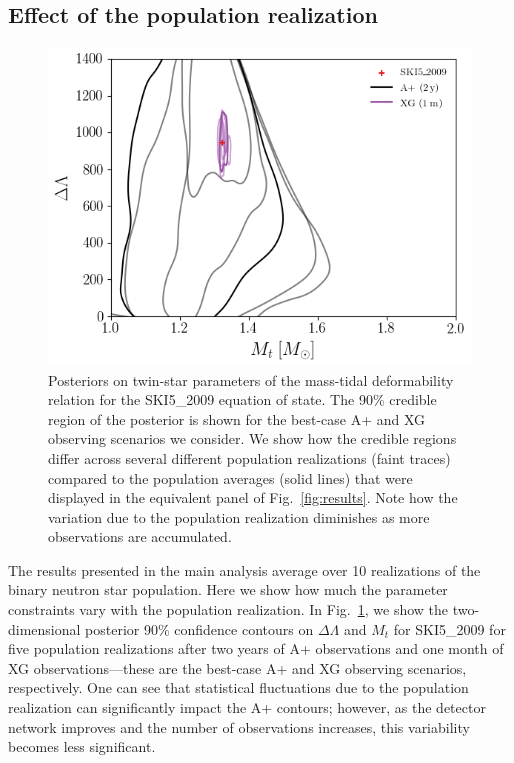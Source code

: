 \documentclass[aps,prd,twocolumn,superscriptaddress,nofootinbib]{revtex4-1}
\begin{document}
\subsection{Effect of the population realization}

\begin{figure}[t]
      \includegraphics[width=0.95\columnwidth]{SKI52009_pops.png}
    \caption{Posteriors on twin-star parameters of the mass-tidal deformability relation for the SKI5\_2009 equation of state. The 90\% credible region of the posterior is shown for the best-case A+ and XG observing scenarios we consider. We show how the credible regions differ across several different population realizations (faint traces) compared to the population averages (solid lines) that were displayed in the equivalent panel of Fig.~\ref{fig:results}. Note how the variation due to the population realization diminishes as more observations are accumulated.}
    \label{fig:results_indiv}
\end{figure}

The results presented in the main analysis average over 10 realizations of the binary neutron star population. Here we show how much the parameter constraints vary with the population realization. In Fig.~\ref{fig:results_indiv}, we show the two-dimensional posterior 90\% confidence contours on $\Delta\Lambda$ and $M_t$ for SKI5\_2009 for five population realizations after two years of A+ observations and one month of XG observations---these are the best-case A+ and XG observing scenarios, respectively. One can see that statistical fluctuations due to the population realization can significantly impact the A+ contours; however, as the detector network improves and the number of observations increases, this variability becomes less significant.
\end{document}
